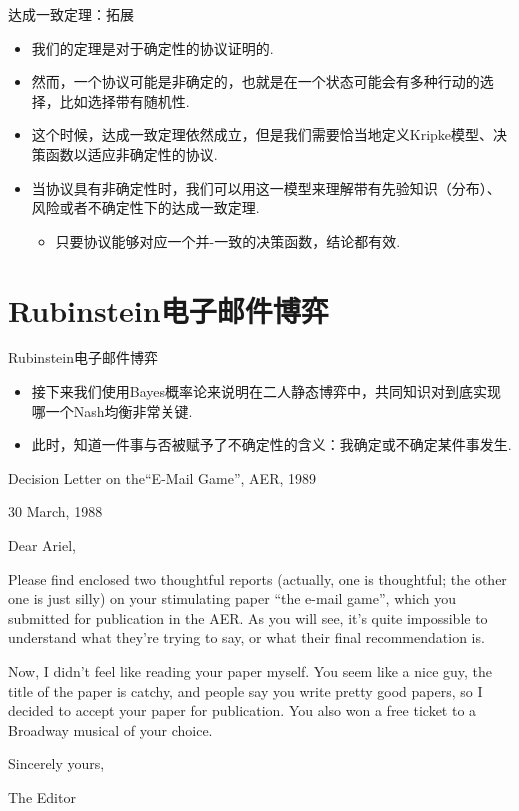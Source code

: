 {达成一致定理：拓展}
\begin{itemize}
    \item 我们的定理是对于确定性的协议证明的.
    \item 然而，一个协议可能是非确定的，也就是在一个状态可能会有多种行动的选择，比如选择带有随机性.
    \item 这个时候，达成一致定理依然成立，但是我们需要恰当地定义Kripke模型、决策函数以适应非确定性的协议.
    \item 当协议具有非确定性时，我们可以用这一模型来理解带有先验知识（分布）、风险或者不确定性下的达成一致定理.
    \begin{itemize}
        \item 只要协议能够对应一个并-一致的决策函数，结论都有效.
    \end{itemize}
\end{itemize}


\section{Rubinstein电子邮件博弈}
{Rubinstein电子邮件博弈}
\begin{itemize}
    \item 接下来我们使用Bayes概率论来说明在二人静态博弈中，共同知识对到底实现哪一个Nash均衡非常关键.
    \item 此时，知道一件事与否被赋予了不确定性的含义：我确定或不确定某件事发生.
\end{itemize}

{Decision Letter on the``E-Mail Game'', AER, 1989}
\begin{center}
    \begin{minipage}[c]{0.8\textwidth}
\footnotesize
\hfill 30 March, 1988

Dear Ariel,

\hfill

Please find enclosed two thoughtful reports (actually, one is thoughtful; the other one is just silly) on your stimulating paper ``the e-mail game'', which you submitted for publication in the AER. As you will see, it's quite impossible to understand what they're trying to say, or what their final recommendation is.

Now, I didn't feel like reading your paper myself. You seem like a nice guy, the title of the paper is catchy, and people say you write pretty good papers, so I decided to accept your paper for publication. You also won a free ticket to a Broadway musical of your choice.

\hfill

Sincerely yours, 

The Editor
\end{minipage}
\end{center}


